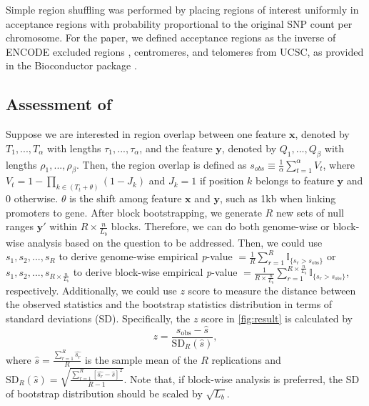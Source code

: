 \documentclass{article}
\begin{document}
Simple region shuffling was performed by placing regions of interest
uniformly in acceptance regions with probability proportional to the
original SNP count per chromosome. For the paper, we defined
acceptance regions as the inverse of
ENCODE excluded regions ,
centromeres, and telomeres from UCSC,
as provided in the  Bioconductor package
\citep{excluderanges}.

\subsection{Assessment of \bootranges}
Suppose we are interested in region overlap between one feature $\bm{x}$, denoted by $T_1, ..., T_\alpha$ with lengths $\tau_1,..., \tau_\alpha$, and the feature $\bm{y}$, denoted by $Q_1, ..., Q_\beta$ with lengths $\rho_1, ..., \rho_\beta$.
Then, the region overlap is defined as $s_{obs} \equiv  \frac{1}{\alpha}\sum_{t=1}^\alpha V_t$, where $V_t=1-\prod_{k\in (T_t+\theta)}(1-J_k)$ and $J_k=1$ if position $k$ belongs to feature $\bm{y}$ and 0 otherwise. 
$\theta$ is the shift among feature $\bm{x}$ and $\bm{y}$, such as 1kb when linking promoters to gene. 
After block bootstrapping, we generate $R$ new sets of null ranges $\bm{y'}$ within $R\times \frac{n}{L_b}$ blocks. 
Therefore, we can do both genome-wise or block-wise analysis based on the question to be addressed.
Then, we could use $s_{1}, s_{2}, ..., s_{R}$ to derive genome-wise empirical \textit{p}-value $=  \frac{1}{R} \sum_{r=1}^R \mathbb{I}_{\{s_r > s_\text{obs}\}}$ or $s_{1}, s_{2}, ..., s_{R\times \frac{n}{L_b}}$ to derive block-wise empirical \textit{p}-value $=  \frac{1}{R\times \frac{n}{L_b}} \sum_{r=1}^{R\times \frac{n}{L_b}} \mathbb{I}_{\{s_r > s_{obs}\}}$, respectively.
Additionally, we could use $z$ score to measure the distance between the observed statistics and the bootstrap statistics distribution in terms of standard deviations (SD). 
Specifically, the $z$ score in \cref{fig:result} is calculated by $$z = \frac{s_\text{obs} - \widehat{s}}{ \text{SD}_R(\widehat{s})},$$ where $\widehat{s} = \frac{\sum_{r=1}^R \widehat{s_r}}{R}$ is the sample mean of the $R$ replications and $\text{SD}_R(\widehat{s}) = \sqrt{\frac{\sum_{r=1}^R [\widehat{s_r}-\widehat{s}]^2}{R-1}}$.
Note that, if block-wise analysis is preferred, the SD of bootstrap distribution should be scaled by $\sqrt{L_b}$.




\end{document}
